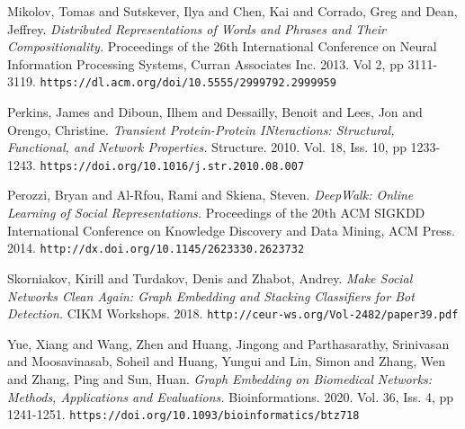 \documentclass[10pt]{article}
\begin{document}
\begin{multicols}{2}
\begin{thebibliography}{5}
Mikolov, Tomas and Sutskever, Ilya and Chen, Kai and Corrado, Greg and Dean, Jeffrey.
\textit{Distributed Representations of Words and Phrases and Their Compositionality.}
Proceedings of the 26th International Conference on Neural Information Processing Systems, Curran Associates Inc. 2013. Vol 2, pp 3111-3119.
\texttt{https://dl.acm.org/doi/10.5555/2999792.2999959}

Perkins, James and Diboun, Ilhem and Dessailly, Benoit and Lees, Jon and Orengo, Christine.
\textit{Transient Protein-Protein INteractions: Structural, Functional, and Network Properties.}
Structure. 2010. Vol. 18, Iss. 10, pp 1233-1243.
\texttt{https://doi.org/10.1016/j.str.2010.08.007}

Perozzi, Bryan and Al-Rfou, Rami and Skiena, Steven.
\textit{DeepWalk: Online Learning of Social Representations.}
Proceedings of the 20th ACM SIGKDD International Conference on Knowledge Discovery and Data Mining, ACM Press. 2014.
\texttt{http://dx.doi.org/10.1145/2623330.2623732}

Skorniakov, Kirill and Turdakov, Denis and Zhabot, Andrey.
\textit{Make Social Networks Clean Again: Graph Embedding and Stacking Classifiers for Bot Detection.}
CIKM Workshops. 2018.
\texttt{http://ceur-ws.org/Vol-2482/paper39.pdf}

Yue, Xiang and Wang, Zhen and Huang, Jingong and Parthasarathy, Srinivasan and Moosavinasab, Soheil and Huang, Yungui and Lin, Simon and Zhang, Wen and Zhang, Ping and Sun, Huan.
\textit{Graph Embedding on Biomedical Networks: Methods, Applications and Evaluations.}
Bioinformations. 2020. Vol. 36, Iss. 4, pp 1241-1251.
\texttt{https://doi.org/10.1093/bioinformatics/btz718}

\end{thebibliography}

\end{multicols}
\end{document}
